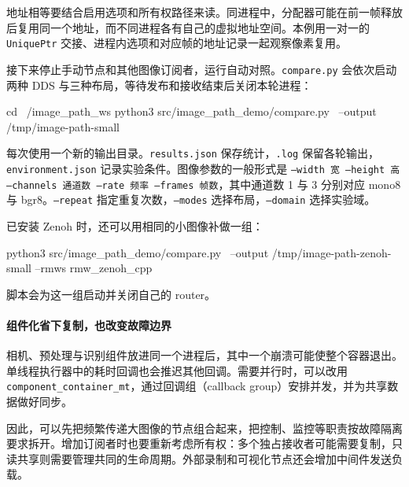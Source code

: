 \begin{example}
\begin{note}
地址相等要结合启用选项和所有权路径来读。同进程中，分配器可能在前一帧释放后复用同一个地址，而不同进程各有自己的虚拟地址空间。本例用一对一的 \texttt{UniquePtr} 交接、进程内选项和对应帧的地址记录一起观察像素复用。
\end{note}

接下来停止手动节点和其他图像订阅者，运行自动对照。\texttt{compare.py} 会依次启动两种 DDS 与三种布局，等待发布和接收结束后关闭本轮进程：
\par\medskip\noindent\begin{minipage}{\linewidth}
\begin{tbash}
cd ~/image_path_ws
python3 src/image_path_demo/compare.py \
  --output /tmp/image-path-small
\end{tbash}
\end{minipage}\par\smallskip
每次使用一个新的输出目录。\texttt{results.json} 保存统计，\texttt{.log} 保留各轮输出，\texttt{environment.json} 记录实验条件。图像参数的一般形式是 \texttt{--width 宽 --height 高 --channels 通道数 --rate 频率 --frames 帧数}，其中通道数 1 与 3 分别对应 mono8 与 bgr8。\texttt{--repeat} 指定重复次数，\texttt{--modes} 选择布局，\texttt{--domain} 选择实验域。

已安装 Zenoh 时，还可以用相同的小图像补做一组：
\par\medskip\noindent\begin{minipage}{\linewidth}
\begin{tbash}
python3 src/image_path_demo/compare.py \
  --output /tmp/image-path-zenoh-small --rmws rmw_zenoh_cpp
\end{tbash}
\end{minipage}\par\smallskip
脚本会为这一组启动并关闭自己的 router。
\end{example}

\paragraph*{组件化省下复制，也改变故障边界}
相机、预处理与识别组件放进同一个进程后，其中一个崩溃可能使整个容器退出。单线程执行器中的耗时回调也会推迟其他回调。需要并行时，可以改用 \nolinkurl{component_container_mt}，通过回调组（callback group）安排并发，并为共享数据做好同步。

因此，可以先把频繁传递大图像的节点组合起来，把控制、监控等职责按故障隔离要求拆开。增加订阅者时也要重新考虑所有权：多个独占接收者可能需要复制，只读共享则需要管理共同的生命周期。外部录制和可视化节点还会增加中间件发送负载。

